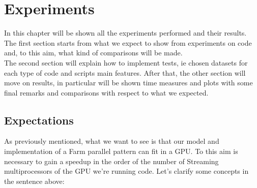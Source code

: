 \chapter{Experiments}
\label{chap:experim}
In this chapter will be shown all the experiments performed and their results. The first section starts from what we expect to show from experiments on code and, to this aim, what kind of comparisons will be made.\\
The second section will explain how to implement tests, ie chosen datasets for each type of code and scripts main features.
After that, the other section will move on results, in particular will be shown time measures and plots with some final remarks and comparisons with respect to what we expected.

\section{Expectations}
As previously mentioned, what we want to see is that our model and implementation of a Farm parallel pattern can fit in a GPU.
To this aim is necessary to gain a speedup in the order of the number of Streaming multiprocessors of the GPU we're running code.
Let's clarify some concepts in the sentence above:

